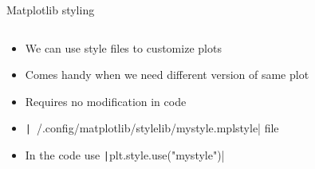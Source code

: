 \documentclass[aspectratio=169]{beamer}
\newcommand{\code}[2][python]{\texttt|#2|}
\begin{document}
\begin{frame}{Matplotlib styling}
    \begin{columns}
        \begin{column}{0.58\textwidth}
            \begin{itemize}
                \item We can use style files to customize plots
                \item Comes handy when we need different version of same plot
                \item Requires no modification in code
                \item \code{~/.config/matplotlib/stylelib/mystyle.mplstyle} file
                \item In the code use \code{plt.style.use("mystyle")}
            \end{itemize}
        \end{column}
        \begin{column}{0.40\textwidth}

\end{column}
\end{columns}
\end{frame}
\end{document}
